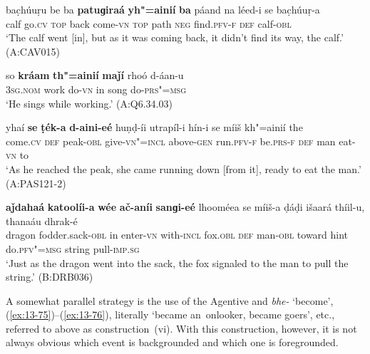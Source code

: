 \begin{exe}
\ex
\label{ex:13-71}
\gll bac̣húuṛu be ba \textbf{patuɡiraá} \textbf{yh"=ainií} \textbf{ba} páand na léed-i se bac̣húuṛ-a \\
calf go.\textsc{cv} \textsc{top} back come-\textsc{vn }  \textsc{top} path \textsc{neg} find.\textsc{pfv-f} \textsc{def} calf-\textsc{obl}  \\
\glt `The calf went [in], but as it was coming back, it didn't find its way, the calf.' (A:CAV015)

\ex
\label{ex:13-72}
\gll so \textbf{kráam} \textbf{th"=ainií} \textbf{maǰí} rhoó d-áan-u  \\
\textsc{3sg.nom} work do-\textsc{vn} in song do-\textsc{prs"=msg}  \\
\glt `He sings while working.' (A:Q6.34.03)

\ex
\label{ex:13-73}
\gll yhaí \textbf{se} \textbf{ṭék-a} \textbf{d-aini-eé} huṇḍ-íi utrapíl-i hín-i se míiš kh"=ainií the \\
come.\textsc{cv} \textsc{def} peak-\textsc{obl} give-\textsc{vn"=incl} above-\textsc{gen} run.\textsc{pfv-f}  be.\textsc{prs-f } \textsc{def} man eat-\textsc{vn} to  \\
\glt `As he reached the peak, she came running down [from it], ready to eat the man.' (A:PAS121-2)

\ex
\label{ex:13-74}
\gll \textbf{aǰdahaá} \textbf{katoolíi-a} \textbf{wée} \textbf{ač-aníi} \textbf{sanɡi-eé} lhooméea se míiš-a ḍáḍi išaará thíil-u, thanaáu dhrak-é \\
dragon fodder.sack-\textsc{obl} in enter-\textsc{vn} with-\textsc{incl}  fox.\textsc{obl} \textsc{def} man-\textsc{obl} toward hint do.\textsc{pfv"=msg} string pull-\textsc{imp.sg}  \\
\glt `Just as the dragon went into the sack, the fox signaled to the man to pull the string.' (B:DRB036)
\end{exe}

A somewhat parallel strategy is the use of the Agentive  and \textit{bhe-} `become', (\ref{ex:13-75})--(\ref{ex:13-76}), literally `became an~onlooker, became goers', etc., referred to above as construction~(vi). With this construction, however, it is not always obvious which event is backgrounded and which one is foregrounded. 

